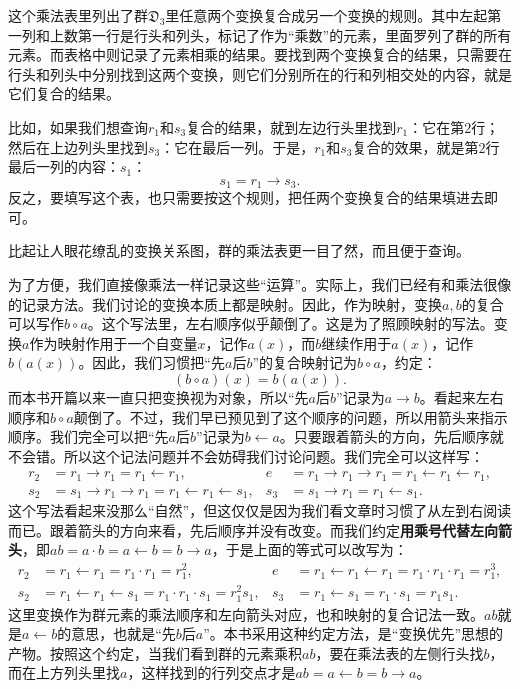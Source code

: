 \documentclass[12pt,UTF8,fontset=none]{ctexbook}
\begin{document}
\vspace{12pt}
这个乘法表里列出了群$\mathfrak{D}_3$里任意两个变换复合成另一个变换的规则。其中左起第一列和上数第一行是行头和列头，标记了作为“乘数”的元素，里面罗列了群的所有元素。而表格中则记录了元素相乘的结果。要找到两个变换复合的结果，只需要在行头和列头中分别找到这两个变换，则它们分别所在的行和列相交处的内容，就是它们复合的结果。

比如，如果我们想查询$r_1$和$s_3$复合的结果，就到左边行头里找到$r_1$：它在第$2$行；然后在上边列头里找到$s_3$：它在最后一列。于是，$r_1$和$s_3$复合的效果，就是第$2$行最后一列的内容：$s_1$：
$$ s_1 = r_1\rightarrow s_3.$$
反之，要填写这个表，也只需要按这个规则，把任两个变换复合的结果填进去即可。

比起让人眼花缭乱的变换关系图，群的乘法表更一目了然，而且便于查询。

为了方便，我们直接像乘法一样记录这些“运算”。实际上，我们已经有和乘法很像的记录方法。我们讨论的变换本质上都是映射。因此，作为映射，变换$a,b$的复合可以写作$b\circ a$。这个写法里，左右顺序似乎颠倒了。这是为了照顾映射的写法。变换$a$作为映射作用于一个自变量$x$，记作$a(x)$，而$b$继续作用于$a(x)$，记作$b(a(x))$。因此，我们习惯把“先$a$后$b$”的复合映射记为$b\circ a$，约定：
$$(b\circ a)(x) = b(a(x)).$$
而本书开篇以来一直只把变换视为对象，所以“先$a$后$b$”记录为$a\rightarrow b$。看起来左右顺序和$b\circ a$颠倒了。不过，我们早已预见到了这个顺序的问题，所以用箭头来指示顺序。我们完全可以把“先$a$后$b$”记录为$b\leftarrow a$。只要跟着箭头的方向，先后顺序就不会错。所以这个记法问题并不会妨碍我们讨论问题。我们完全可以这样写：
\begin{align*}
    r_2 &= r_1\rightarrow r_1 = r_1\leftarrow r_1, & e &= r_1\rightarrow r_1\rightarrow r_1 = r_1\leftarrow r_1\leftarrow r_1, \\
    s_2 &= s_1\rightarrow r_1\rightarrow r_1 = r_1\leftarrow r_1\leftarrow s_1, &s_3 &= s_1\rightarrow r_1 = r_1\leftarrow s_1.
\end{align*}
这个写法看起来没那么“自然”，但这仅仅是因为我们看文章时习惯了从左到右阅读而已。跟着箭头的方向来看，先后顺序并没有改变。而我们约定\textbf{用乘号代替左向箭头}，即$ab = a\cdot b = a\leftarrow b = b\rightarrow a$，于是上面的等式可以改写为：
\begin{align*}
    r_2 &= r_1\leftarrow r_1 = r_1\cdot r_1 = r_1^2, & e &= r_1\leftarrow r_1\leftarrow r_1= r_1\cdot r_1\cdot r_1 = r_1^3, \\
    s_2 &= r_1\leftarrow r_1\leftarrow s_1 = r_1\cdot r_1\cdot s_1 = r_1^2s_1, & s_3 & = r_1\leftarrow s_1 = r_1\cdot s_1 = r_1s_1.
\end{align*}
这里变换作为群元素的乘法顺序和左向箭头对应，也和映射的复合记法一致。$ab$就是$a\leftarrow b$的意思，也就是“先$b$后$a$”。本书采用这种约定方法，是“变换优先”思想的产物。按照这个约定，当我们看到群的元素乘积$ab$，要在乘法表的左侧行头找$b$，而在上方列头里找$a$，这样找到的行列交点才是$ab = a\leftarrow b = b\rightarrow a$。
\end{document}
